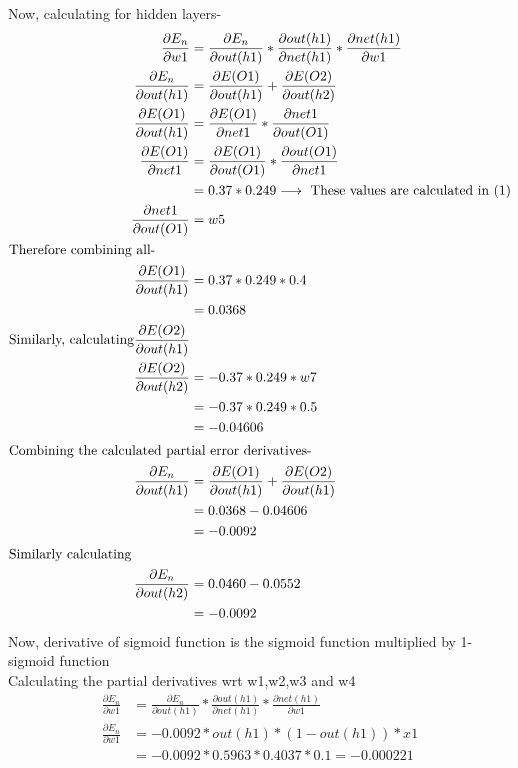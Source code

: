 \documentclass[12pt]{article}
\begin{document}
Now, calculating for hidden layers-
\begin{align*}
    \frac{\partial E_n}{\partial w1}
    &=\frac{\partial E_n}{\partial out(h1)}*\frac{\partial out(h1)}{\partial net(h1)} * \frac{\partial net(h1)}{\partial w1}\\
    \frac{\partial E_n}{\partial out(h1)}
    &=\frac{\partial E(O1)}{\partial out(h1)} + \frac{\partial E(O2)}{\partial out(h2)}\\
    \frac{\partial E(O1)}{\partial out(h1)}
    &=\frac{\partial E(O1)}{\partial net1}*\frac{\partial net1}{\partial out(O1)}\\
    \frac{\partial E(O1)}{\partial net1}
    &=\frac{\partial E(O1)}{\partial out(O1)}*\frac{\partial out(O1)}{\partial net1}\\
    &=0.37*0.249 \longrightarrow \text{ These values are calculated in (1)}\\
    \frac{\partial net1}{\partial out(O1)}
    &= w5 \\
    \intertext{Therefore combining all-}
    \frac{\partial E(O1)}{\partial out(h1)}
    &=0.37*0.249*0.4 \\
    &=0.0368\\
    \text{Similarly, calculating} \frac{\partial E(O2)}{\partial out(h1)}\\
    \frac{\partial E(O2)}{\partial out(h2)}
    &=-0.37*0.249*w7\\
    &=-0.37*0.249*0.5\\
    &=-0.04606\\
    \intertext{Combining the calculated partial error derivatives-}
    \frac{\partial E_n}{\partial out(h1)}
    &=\frac{\partial E(O1)}{\partial out(h1)} + \frac{\partial E(O2)}{\partial out(h1)}\\
    &=0.0368-0.04606\\
    &=-0.0092\\
    \intertext{Similarly calculating}
    \frac{\partial E_n}{\partial out(h2)}
    &=0.0460-0.0552\\
    &=-0.0092
\end{align*}
Now, derivative of sigmoid function is the sigmoid function multiplied by 1-sigmoid function\\
Calculating the partial derivatives wrt w1,w2,w3 and w4
\begin{align*}
    \frac{\partial E_n}{\partial w1}
    &=\frac{\partial E_n}{\partial out(h1)} * \frac{\partial out(h1)}{\partial net(h1)} * \frac{\partial net(h1)}{\partial w1} \\
    \frac{\partial E_n}{\partial w1}
    &=-0.0092*out(h1)*(1-out(h1)) * x1\\
    &=-0.0092*0.5963*0.4037*0.1=-0.000221
\end{align*}
\end{document}
